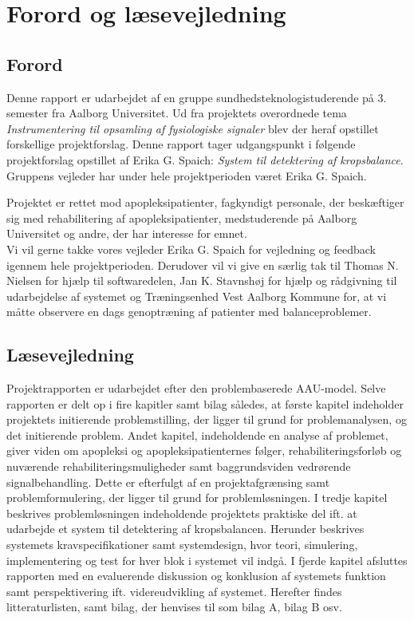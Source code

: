 \chapter*{Forord og læsevejledning}
\section*{Forord}
Denne rapport er udarbejdet af en gruppe sundhedsteknologistuderende på 3. semester fra Aalborg Universitet. Ud fra projektets overordnede tema \textit{Instrumentering til opsamling af fysiologiske signaler} blev der heraf opstillet forskellige projektforslag. Denne rapport tager udgangspunkt i følgende projektforslag opstillet af Erika G. Spaich: \textit{System til detektering af kropsbalance}. Gruppens vejleder har under hele projektperioden været Erika G. Spaich.

Projektet er rettet mod apopleksipatienter, fagkyndigt personale, der beskæftiger sig med rehabilitering af apopleksipatienter, medstuderende på Aalborg Universitet og andre, der har interesse for emnet. \\
Vi vil gerne takke vores vejleder Erika G. Spaich for vejledning og feedback igennem hele projektperioden. Derudover vil vi give en særlig tak til Thomas N. Nielsen for hjælp til softwaredelen, Jan K. Stavnshøj for hjælp og rådgivning til udarbejdelse af systemet og Træningsenhed Vest Aalborg Kommune for, at vi måtte observere en dags genoptræning af patienter med balanceproblemer. 

\section*{Læsevejledning}
Projektrapporten er udarbejdet efter den problembaserede AAU-model. Selve rapporten er delt op i fire kapitler samt bilag således, at første kapitel indeholder projektets initierende problemstilling, der ligger til grund for problemanalysen, og det initierende problem. Andet kapitel, indeholdende en analyse af problemet, giver viden om apopleksi og apopleksipatienternes følger, rehabiliteringsforløb og nuværende rehabiliteringsmuligheder samt baggrundsviden vedrørende signalbehandling. Dette er efterfulgt af en projektafgrænsing samt problemformulering, der ligger til grund for problemløsningen. I tredje kapitel beskrives problemløsningen indeholdende projektets praktiske del ift. at udarbejde et system til detektering af kropsbalancen. Herunder beskrives systemets kravspecifikationer samt systemdesign, hvor teori, simulering, implementering og test for hver blok i systemet vil indgå. I fjerde kapitel afsluttes rapporten med en evaluerende diskussion og konklusion af systemets funktion samt perspektivering ift. videreudvikling af systemet. Herefter findes litteraturlisten, samt bilag, der henvises til som bilag A, bilag B osv. 

